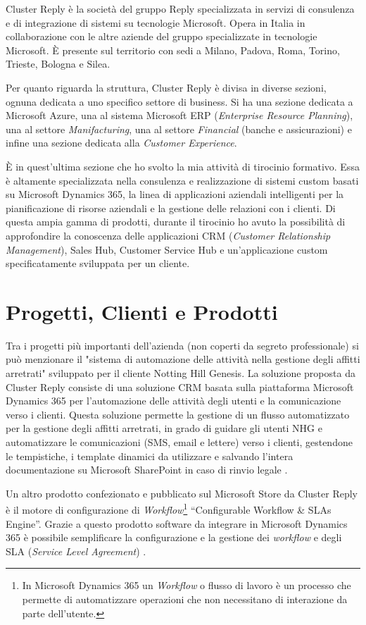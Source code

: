 Cluster Reply è la società del gruppo Reply specializzata in servizi di consulenza e di integrazione di sistemi su tecnologie Microsoft. Opera in Italia in collaborazione con le altre aziende del gruppo specializzate in tecnologie Microsoft. È presente sul territorio con sedi a Milano, Padova, Roma, Torino, Trieste, Bologna e Silea. 

Per quanto riguarda la struttura, Cluster Reply è divisa in diverse sezioni, ognuna dedicata a uno specifico settore di business. Si ha una sezione dedicata a Microsoft Azure, una al sistema Microsoft ERP (\textit{Enterprise Resource Planning}), una al settore \textit{Manifacturing}, una al settore \textit{Financial} (banche e assicurazioni) e infine una sezione dedicata alla \textit{Customer Experience}.

È in quest'ultima sezione che ho svolto la mia attività di tirocinio formativo. Essa è altamente specializzata nella consulenza e realizzazione di sistemi custom basati su Microsoft Dynamics 365, la linea di applicazioni aziendali intelligenti per la pianificazione di risorse aziendali e la gestione delle relazioni con i clienti. Di questa ampia gamma di prodotti, durante il tirocinio ho avuto la possibilità di approfondire la conoscenza delle applicazioni CRM (\textit{Customer Relationship Management}), Sales Hub, Customer Service Hub e un'applicazione custom specificatamente sviluppata per un cliente.

\section{Progetti, Clienti e Prodotti}
Tra i progetti più importanti dell'azienda (non coperti da segreto professionale) si può menzionare il "sistema di automazione delle attività nella gestione degli affitti arretrati" sviluppato per il cliente Notting Hill Genesis. La soluzione proposta da Cluster Reply consiste di una soluzione CRM basata sulla piattaforma Microsoft Dynamics 365 per l'automazione  delle attività degli utenti e la comunicazione verso i clienti. Questa soluzione permette la gestione di un flusso automatizzato per la gestione degli affitti arretrati, in grado di guidare gli utenti NHG e automatizzare le comunicazioni (SMS, email e lettere) verso i clienti, gestendone le tempistiche, i template dinamici da utilizzare e salvando l'intera documentazione su Microsoft SharePoint in caso di rinvio legale \cite{NHG}.

Un altro prodotto confezionato e pubblicato sul Microsoft Store da Cluster Reply è il motore di configurazione di \textit{Workflow}\footnote{In Microsoft Dynamics 365 un \textit{Workflow} o flusso di lavoro è un processo che permette di automatizzare operazioni che non necessitano di interazione da parte dell'utente.} “Configurable Workflow \& SLAs Engine”. Grazie a questo prodotto software da integrare in Microsoft Dynamics 365 è possibile semplificare la configurazione e la gestione dei \textit{workflow} e degli SLA (\textit{Service Level Agreement}) \cite{configurableWorkflow}.

